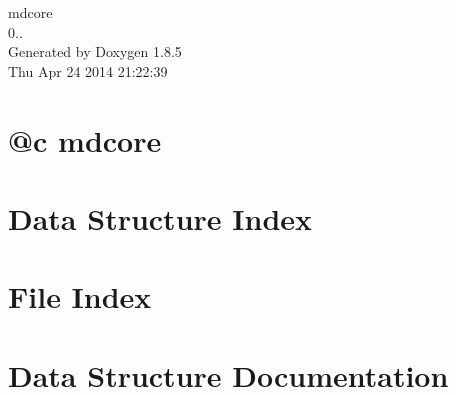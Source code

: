 \documentclass[twoside]{book}
\newcommand{\clearemptydoublepage}{%
  \newpage{\pagestyle{empty}\cleardoublepage}%
}
\begin{document}
\hypersetup{pageanchor=false}
\begin{titlepage}
\vspace*{7cm}
\begin{center}%
{\Large mdcore \\[1ex]\large 0.. }\\
\vspace*{1cm}
{\large Generated by Doxygen 1.8.5}\\
\vspace*{0.5cm}
{\small Thu Apr 24 2014 21:22:39}\\
\end{center}
\end{titlepage}
\clearemptydoublepage
\tableofcontents
\clearemptydoublepage
{}
\hypersetup{pageanchor=true}

\chapter{@c mdcore}
\label{index}\hypertarget{index}{}
\chapter{Data Structure Index}

\chapter{File Index}

\chapter{Data Structure Documentation}























\end{document}
